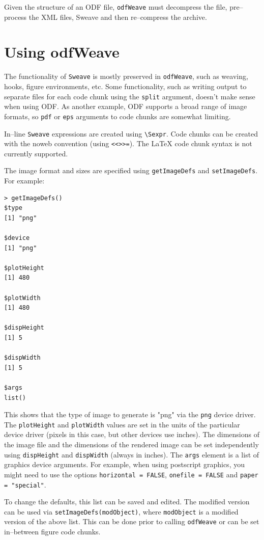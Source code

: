 \documentclass[12pt]{article}
\begin{document}
Given the structure of an ODF file, \texttt{odfWeave} must decompress the file, pre--process the XML files, Sweave and then re--compress the archive. 


\section{Using odfWeave}

The functionality of \texttt{Sweave} is mostly preserved in \texttt{odfWeave}, such as weaving, hooks, figure environments, etc. Some functionality, such as writing output to separate files for each code chunk using the \texttt{split} argument, doesn't make sense when using ODF. As another example, ODF supports a broad range of image formats, so \texttt{pdf} or \texttt{eps} arguments to code chunks are somewhat limiting.

In--line \texttt{Sweave} expressions are created using \verb|\Sexpr|. Code chunks can be created with the noweb convention (using \verb|<<>>=|). The \LaTeX{} code chunk syntax is not currently supported.

The image format and sizes are specified using \texttt{getImageDefs} and \texttt{setImageDefs}. For example:
\begin{Verbatim}[samepage=true]
> getImageDefs()
$type
[1] "png"

$device
[1] "png"

$plotHeight
[1] 480

$plotWidth
[1] 480

$dispHeight
[1] 5

$dispWidth
[1] 5

$args
list()
\end{Verbatim}

This shows that the type of image to generate is "png" via the \texttt{png} device driver. The \texttt{plotHeight} and \texttt{plotWidth} values are set in the units of the particular device driver (pixels in this case, but other devices use inches). The dimensions of the image file and the dimensions of the rendered image can be set independently using \texttt{dispHeight} and \texttt{dispWidth} (always in inches). The \texttt{args} element is a list of graphics device arguments. For example, when using postscript graphics, you might need to use the options \texttt{horizontal = FALSE}, \texttt{onefile = FALSE} and \texttt{paper = "special"}.

To change the defaults, this list can be saved and edited. The modified version can be used via \texttt{setImageDefs(modObject)}, where \texttt{modObject} is a modified version of the above list. This can be done prior to calling \texttt{odfWeave} or can be set in--between figure code chunks.
\end{document}
